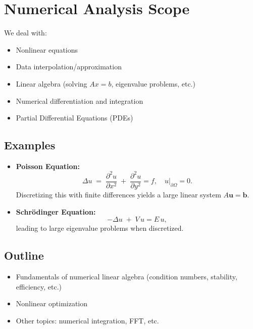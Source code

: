 \section*{Numerical Analysis Scope}

We deal with:
\begin{itemize}
    \item Nonlinear equations
    \item Data interpolation/approximation
    \item Linear algebra (solving $A x = b$, eigenvalue problems, etc.)
    \item Numerical differentiation and integration
    \item Partial Differential Equations (PDEs)
\end{itemize}

\subsection*{Examples}
\begin{itemize}
    \item \textbf{Poisson Equation:}
    \[
      \Delta u \;=\; \frac{\partial^2 u}{\partial x^2} 
      \;+\; \frac{\partial^2 u}{\partial y^2} 
      = f,\quad u\big|_{\partial \Omega} = 0.
    \]
    Discretizing this with finite differences yields a large linear system $A\mathbf{u} = \mathbf{b}$.
    \item \textbf{Schr\"odinger Equation:}
    \[
      -\Delta u \;+\; V\,u = E\,u,
    \]
    leading to large eigenvalue problems when discretized.
\end{itemize}

\subsection*{Outline}
\begin{itemize}
    \item Fundamentals of numerical linear algebra (condition numbers, stability, efficiency, etc.)
    \item Nonlinear optimization
    \item Other topics: numerical integration, FFT, etc.
\end{itemize}
